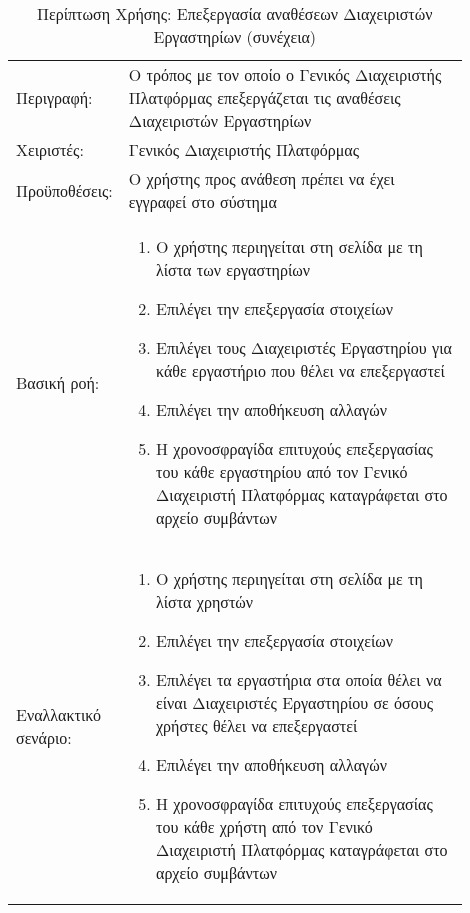 %
%
\begin{longtable}{|p{0.14\linewidth}|p{0.76\linewidth}|}
	\caption{Περίπτωση Χρήσης: Επεξεργασία αναθέσεων Διαχειριστών Εργαστηρίων} \label{tab:use-case-edit-lab-admin} \\ \hline \endfirsthead
	\caption[{}]{Περίπτωση Χρήσης: Επεξεργασία αναθέσεων Διαχειριστών Εργαστηρίων (συνέχεια)} \\ \endhead \endfoot
	Περιγραφή: & Ο τρόπος με τον οποίο ο Γενικός Διαχειριστής Πλατφόρμας επεξεργάζεται τις αναθέσεις Διαχειριστών Εργαστηρίων \\ \hline
	Χειριστές: & Γενικός Διαχειριστής Πλατφόρμας \\ \hline
	Προϋποθέσεις: & Ο χρήστης προς ανάθεση πρέπει να έχει εγγραφεί στο σύστημα \\ \hline
	Βασική ροή: &
	\begin{enumerate}
		\vspace{-1cm}
		\addtolength{\itemindent}{-0.4cm}
		\item Ο χρήστης περιηγείται στη σελίδα με τη λίστα των εργαστηρίων
		\item Επιλέγει την επεξεργασία στοιχείων
		\item Επιλέγει τους Διαχειριστές Εργαστηρίου για κάθε εργαστήριο που θέλει να επεξεργαστεί
		\item Επιλέγει την αποθήκευση αλλαγών
		\item Η χρονοσφραγίδα επιτυχούς επεξεργασίας του κάθε εργαστηρίου από τον Γενικό Διαχειριστή Πλατφόρμας καταγράφεται στο αρχείο συμβάντων
		\vspace{-0.7cm}
	\end{enumerate} \\ \hline
	Εναλλακτικό σενάριο: &
	\begin{enumerate}
		\vspace{-1cm}
		\addtolength{\itemindent}{-0.4cm}
		\item Ο χρήστης περιηγείται στη σελίδα με τη λίστα χρηστών
		\item Επιλέγει την επεξεργασία στοιχείων
		\item Επιλέγει τα εργαστήρια στα οποία θέλει να είναι Διαχειριστές Εργαστηρίου σε όσους χρήστες θέλει να επεξεργαστεί
		\item Επιλέγει την αποθήκευση αλλαγών
		\item Η χρονοσφραγίδα επιτυχούς επεξεργασίας του κάθε χρήστη από τον Γενικό Διαχειριστή Πλατφόρμας καταγράφεται στο αρχείο συμβάντων
		\vspace{-0.7cm}
	\end{enumerate} \\ \hline
\end{longtable}

